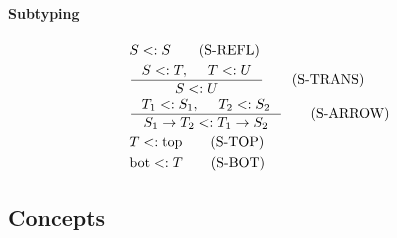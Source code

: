 \documentclass{article}
\newcommand{\mtop}{\mathrm{top}}
\newcommand{\mbot}{\mathrm{bot}}
\begin{document}
\paragraph{Subtyping}
  \begin{align*}
    & S <: S
      \tag{S-REFL}\\
    & \inference
      {S <: T,& T <: U}
      {S <: U}
      \tag{S-TRANS}\\
    & \inference
      {T_1 <: S_1, & T_2 <: S_2}
      {S_1 \to T_2 <: T_1 \to S_2}
      \tag{S-ARROW}\\
    & T <: \mtop
      \tag{S-TOP}\\
    & \mbot <: T
      \tag{S-BOT}\\
  \end{align*}

\subsection{Concepts}
\end{document}
